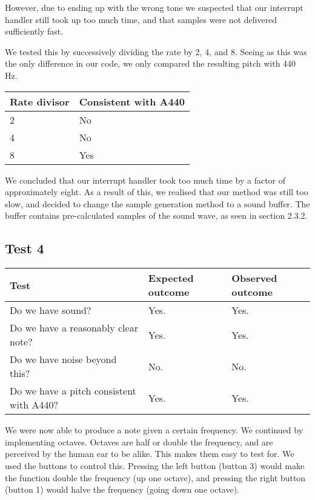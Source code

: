However, due to ending up with the wrong tone we suspected that our interrupt handler still took up too much
time, and that samples were not delivered sufficiently fast.

We tested this by successively dividing the rate by 2, 4, and 8. Seeing as this was the only difference in our code, we only compared the resulting pitch with 440 Hz.
\begin{center}
\begin{tabular}{|l|l|}
\hline
{\sc Rate divisor} & {\sc Consistent with A440} \\ \hline
2 & No \\ \hline
4 & No \\ \hline
8 & Yes \\ \hline
\end{tabular}
\end{center}

We concluded that our interrupt handler took too much time by a factor
of approximately eight. As a result of this, we realised that our method
was still too slow, and decided to change the sample generation method
to a sound buffer. The buffer contains pre-calculated samples of the
sound wave, as seen in section 2.3.2.

\subsection*{Test 4}
\begin{center}
\begin{tabular}{|p{3.6cm}|p{3.6cm}|p{3.6cm}|}
\hline
{\sc Test} & {\sc Expected outcome} & {\sc Observed outcome}\\ \hline
Do we have sound? & Yes. & Yes. \\ \hline
Do we have a reasonably clear note? & Yes. & Yes. \\ \hline
Do we have noise beyond this? & No. & No. \\ \hline
Do we have a pitch consistent with A440? & Yes. & Yes. \\ \hline
\end{tabular}
\end{center}

We were now able to produce a note given a certain frequency. We
continued by implementing octaves. Octaves are half or double the
frequency, and are perceived by the human ear to be alike. This makes
them easy to test for. We used the buttons to control this. Pressing the
left button (button 3) would make the function double the frequency (up
one octave), and pressing the right button (button 1) would halve the
frequency (going down one octave).

